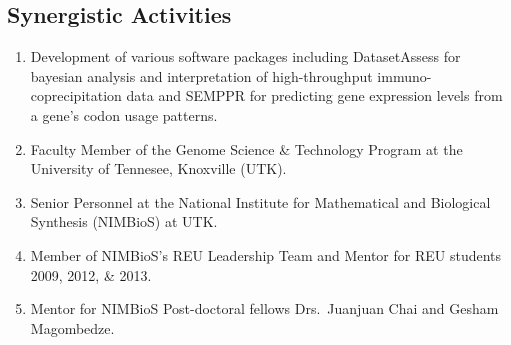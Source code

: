 \documentclass[10pt]{article}
\begin{document}
\subsection*{Synergistic Activities}
\begin{enumerate}
\item Development of various software packages including DatasetAssess for bayesian analysis and interpretation of high-throughput immuno-coprecipitation data and SEMPPR for predicting gene expression levels from a gene's codon usage patterns.
\item Faculty Member of the Genome Science \& Technology Program at the University of Tennesee, Knoxville (UTK).
\item Senior Personnel at the National  Institute for Mathematical and Biological Synthesis (NIMBioS) at UTK.
\item Member of NIMBioS's REU Leadership Team and Mentor for REU students 2009, 2012, \& 2013.
\item Mentor for NIMBioS Post-doctoral fellows Drs.~Juanjuan Chai and Gesham Magombedze.
\end{enumerate}
\end{document}
